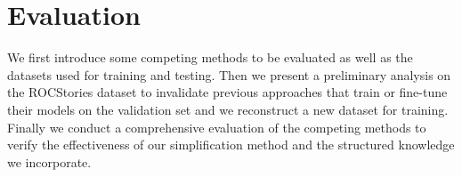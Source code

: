 \section{Evaluation}


\label{sec:experiment}

We first introduce some competing methods to be evaluated as well as
the datasets used for training and testing.
Then we present a preliminary analysis on the ROCStories dataset to invalidate
previous approaches that train or fine-tune their models on the validation
set and we reconstruct a new dataset for training. Finally we conduct a comprehensive
evaluation of the competing methods to verify the effectiveness of our simplification method and 
the structured knowledge we incorporate.



